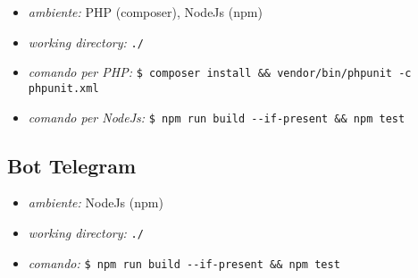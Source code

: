 		\begin{itemize}
			\item \textit{ambiente:} PHP (composer), NodeJs (npm)
			\item \textit{working directory:} \verb!./!
			\item \textit{comando per PHP:} \verb!$ composer install && vendor/bin/phpunit -c phpunit.xml!
			\item \textit{comando per NodeJs:} \verb!$ npm run build --if-present && npm test !
		\end{itemize}

	\subsection{Bot Telegram}

		\begin{itemize}
			\item \textit{ambiente:} NodeJs (npm)
			\item \textit{working directory:} \verb!./!
			\item \textit{comando:} \verb!$ npm run build --if-present && npm test!
		\end{itemize}
		
